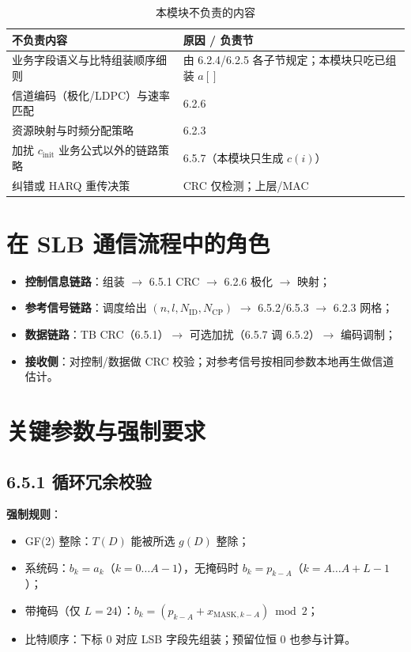 \documentclass[11pt,a4paper]{ctexart}
\begin{document}
\begin{longtable}{L{5.5cm}L{8.5cm}}
\caption{本模块不负责的内容\label{tab:6513-out}} \\
\toprule
\textbf{不负责内容} & \textbf{原因 / 负责节} \\
\midrule
业务字段语义与比特组装顺序细则 & 由 6.2.4/6.2.5 各子节规定；本模块只吃已组装 $a[]$ \\
信道编码（极化/LDPC）与速率匹配 & 6.2.6 \\
资源映射与时频分配策略 & 6.2.3 \\
加扰 $c_{\mathrm{init}}$ 业务公式以外的链路策略 & 6.5.7（本模块只生成 $c(i)$） \\
纠错或 HARQ 重传决策 & CRC 仅检测；上层/MAC \\
\bottomrule
\end{longtable}

\section{在 SLB 通信流程中的角色}

\begin{itemize}[nosep]
  \item \textbf{控制信息链路}：组装 $\rightarrow$ 6.5.1 CRC $\rightarrow$ 6.2.6 极化 $\rightarrow$ 映射；
  \item \textbf{参考信号链路}：调度给出 $(n,l,N_{\mathrm{ID}},N_{\mathrm{CP}})$ $\rightarrow$ 6.5.2/6.5.3 $\rightarrow$ 6.2.3 网格；
  \item \textbf{数据链路}：TB CRC（6.5.1）$\rightarrow$ 可选加扰（6.5.7 调 6.5.2）$\rightarrow$ 编码调制；
  \item \textbf{接收侧}：对控制/数据做 CRC 校验；对参考信号按相同参数本地再生做信道估计。
\end{itemize}

\section{关键参数与强制要求}

\subsection{6.5.1 循环冗余校验}

\textbf{强制规则}：
\begin{itemize}[nosep]
  \item GF(2) 整除：$T(D)$ 能被所选 $g(D)$ 整除；
  \item 系统码：$b_k=a_k$（$k{=}0\ldots A{-}1$），无掩码时 $b_k=p_{k-A}$（$k{=}A\ldots A{+}L{-}1$）；
  \item 带掩码（仅 $L{=}24$）：$b_k=(p_{k-A}+x_{\mathrm{MASK},k-A})\bmod 2$；
  \item 比特顺序：下标 0 对应 LSB 字段先组装；预留位恒 0 也参与计算。
\end{itemize}
\end{document}
